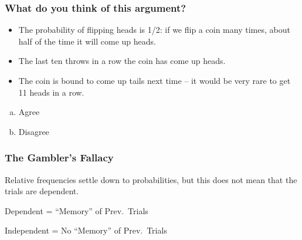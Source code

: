 \documentclass[handout]{beamer}
\begin{document}
\begin{frame}

\frametitle{What do you think of this argument? }
\begin{itemize}
	\item The probability of flipping heads is 1/2: if we flip a coin many times, about half of the time it will come up heads.
	\item The last ten throws in a row the coin has come up heads.
	\item The coin is bound to come up tails next time -- it would be very rare to get 11 heads in a row.
\end{itemize}

\begin{enumerate}[(a)]
	\item Agree
	\item Disagree
\end{enumerate}

\end{frame}
\begin{frame}

\frametitle{The Gambler's Fallacy}

\begin{alertblock}{Relative frequencies settle down to probabilities, but this does not mean that the trials are dependent.}\end{alertblock}


\begin{block}{Dependent = ``Memory'' of Prev.\ Trials}\end{block}

\begin{block}{Independent = No ``Memory'' of Prev.\ Trials}\end{block}



\end{frame}
\end{document}
